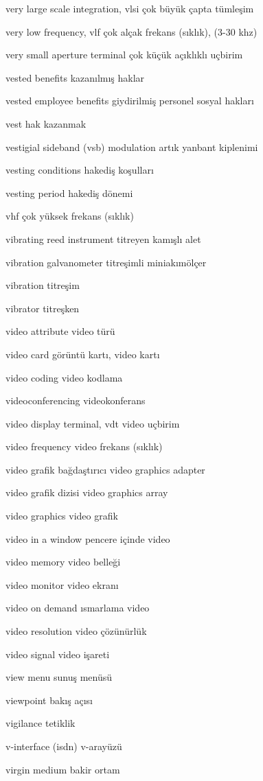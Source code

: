 \documentclass[12pt,fleqn]{article}\usepackage{../../common}
\begin{document}
very large scale integration, vlsi çok büyük çapta tümleşim

very low frequency, vlf çok alçak frekans (sıklık), (3-30 khz)

very small aperture terminal çok küçük açıklıklı uçbirim

vested benefits kazanılmış haklar

vested employee benefits giydirilmiş personel sosyal hakları

vest hak kazanmak

vestigial sideband (vsb) modulation artık yanbant kiplenimi

vesting conditions hakediş koşulları

vesting period hakediş dönemi

vhf çok yüksek frekans (sıklık)

vibrating reed instrument titreyen kamışlı alet

vibration galvanometer titreşimli miniakımölçer

vibration titreşim

vibrator titreşken

video attribute video türü

video card görüntü kartı, video kartı

video coding video kodlama

videoconferencing videokonferans

video display terminal, vdt video uçbirim

video frequency video frekans (sıklık)

video grafik bağdaştırıcı video graphics adapter

video grafik dizisi video graphics array

video graphics video grafik

video in a window pencere içinde video

video memory video belleği

video monitor video ekranı

video on demand ısmarlama video

video resolution video çözünürlük

video signal video işareti

view menu sunuş menüsü

viewpoint bakış açısı

vigilance tetiklik

v-interface (isdn) v-arayüzü

virgin medium bakir ortam
\end{document}
